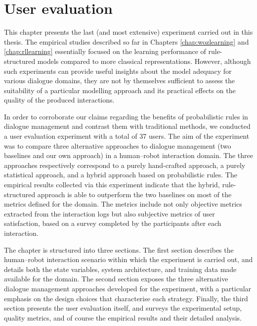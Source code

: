 
\chapter{User evaluation}
\label{chap:user-evaluation}

This chapter presents the last (and most extensive) experiment carried out in this thesis. The empirical studies described so far in Chapters \ref{chap:wozlearning} and \ref{chap:rllearning} essentially focused on the learning performance of rule-structured models compared to more classical representations. However, although such experiments can provide useful insights about the model adequacy for various dialogue domains, they are not by themselves sufficient to assess the suitability of a particular modelling approach and its practical effects on the quality of the produced interactions. 

In order to corroborate our claims regarding the benefits of probabilistic rules in dialogue management and contrast them with traditional methods, we conducted a user evaluation experiment with a total of 37 users. The aim of the experiment was to compare three alternative approaches to dialogue management (two baselines and our own approach) in a human--robot interaction domain.  The three approaches respectively correspond to a purely hand-crafted approach, a purely statistical approach, and a hybrid approach based on probabilistic rules. The empirical results collected via this experiment indicate that the  hybrid, rule-structured approach is able to outperform the two baselines on most of the metrics defined for the domain.  The metrics include not only objective metrics extracted from the interaction logs but also subjective metrics of user satisfaction, based on a survey completed by the participants after each interaction. 

The chapter is structured into three sections.  The first section describes the human--robot interaction scenario within which the experiment is carried out, and details both the state variables, system architecture, and training data made available for the domain. The second section exposes the three alternative dialogue management approaches developed for the experiment, with a particular emphasis on the design choices that characterise each strategy.   Finally, the third section presents the user evaluation itself, and surveys the experimental setup, quality metrics, and of course the empirical results and their detailed analysis. 

